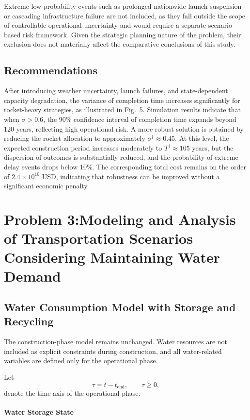 \documentclass[12pt]{article}
\begin{document}
Extreme low-probability events such as prolonged nationwide launch suspension or cascading infrastructure failure are not included, as they fall outside the scope of controllable operational uncertainty and would require a separate scenario-based risk framework. Given the strategic planning nature of the problem, their exclusion does not materially affect the comparative conclusions of this study.

\subsection{Recommendations}

After introducing weather uncertainty, launch failures, and state-dependent capacity degradation, the variance of completion time increases significantly for rocket-heavy strategies, as illustrated in Fig.~5. Simulation results indicate that when $\sigma > 0.6$, the 90\% confidence interval of completion time expands beyond 120 years, reflecting high operational risk. A more robust solution is obtained by reducing the rocket allocation to approximately $\sigma^{\dagger} \approx 0.45$. At this level, the expected construction period increases moderately to $T^{\dagger} \approx 105$ years, but the dispersion of outcomes is substantially reduced, and the probability of extreme delay events drops below 10\%. The corresponding total cost remains on the order of $2.4 \times 10^{10}$ USD, indicating that robustness can be improved without a significant economic penalty.

\section{Problem 3:Modeling and Analysis of Transportation Scenarios Considering Maintaining Water Demand}
\subsection{Water Consumption Model with Storage and Recycling}

The construction-phase model remains unchanged. Water resources are not included as explicit constraints during construction, and all water-related variables are defined only for the operational phase.

Let
\[
\tau = t - t_{\mathrm{end}}, \qquad \tau \ge 0,
\]
denote the time axis of the operational phase.

\paragraph{Water Storage State}
\end{document}
